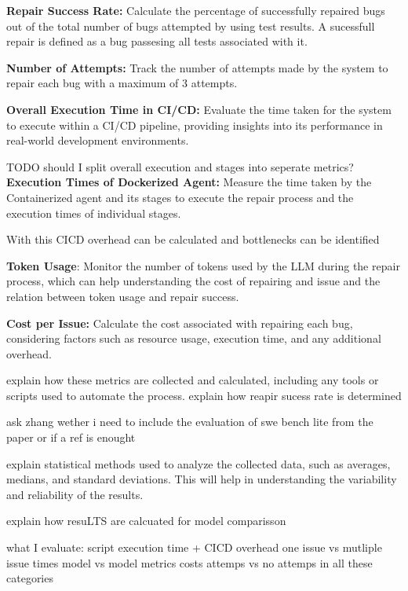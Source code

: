 \textbf{Repair Success Rate:} Calculate the percentage of successfully repaired bugs out of the total number of bugs attempted by using test results.
A sucessfull repair is defined as a bug passesing all tests associated with it.


\textbf{Number of Attempts:} Track the number of attempts made by the system to repair each bug with a maximum of 3 attempts.


\textbf{Overall Execution Time in CI/CD:} Evaluate the time taken for the system to execute within a CI/CD pipeline, providing insights into its performance in real-world development environments.


TODO should I split overall execution and stages into seperate metrics?
\textbf{Execution Times of Dockerized Agent:} Measure the time taken by the Containerized agent and its stages to execute the repair process and the  execution times of individual stages. 

With this CICD overhead can be calculated and bottlenecks can be identified


\textbf{Token Usage}: Monitor the number of tokens used by the LLM during the repair process, which can help understanding the cost of repairing and issue and the relation between token usage and repair success.


\textbf{Cost per Issue:} Calculate the cost associated with repairing each bug, considering factors such as resource usage, execution time, and any additional overhead.


explain how these metrics are collected and calculated, including any tools or scripts used to automate the process.
explain how reapir sucess rate is determined

ask zhang wether i need to include the evaluation of swe bench lite from the paper or if a ref is enought

explain statistical methods used to analyze the collected data, such as averages, medians, and standard deviations. This will help in understanding the variability and reliability of the results.

explain how resuLTS are calcuated for model comparisson

what I evaluate:
script execution time + CICD overhead
one issue vs mutliple issue times
model vs model metrics
costs
attemps vs no attemps in all these categories